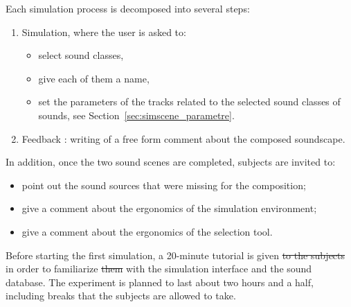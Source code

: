 \documentclass[12pt]{elsarticle}
\providecommand{\DIFadd}[1]{{\protect\color{blue}\uwave{#1}}} %
\providecommand{\DIFdel}[1]{{\protect\color{red}\sout{#1}}}                      %
\providecommand{\DIFaddbegin}{} %
\providecommand{\DIFaddend}{} %
\providecommand{\DIFdelbegin}{} %
\providecommand{\DIFdelend}{} %
\begin{document}
Each simulation process is decomposed into several steps:

 \begin{enumerate} 
\item Simulation, where the user is asked to:
   \begin{itemize} 
  \item  select sound classes,
  \item  give each of them a name,
  \item  set the parameters of the tracks related to the selected sound classes of sounds, see Section~\ref{sec:simscene_parametre}.
   \end{itemize} 
\item Feedback : writing of a free form comment about the composed soundscape.
 \end{enumerate} 

%

In addition, once the two sound scenes are completed, \DIFaddbegin \DIFadd{the }\DIFaddend subjects are invited to:

 \begin{itemize} 
\item  point out the sound sources that were missing for the composition;
\item  give a comment about the ergonomics of the simulation environment;
\item  give a comment about the ergonomics of the selection tool.
 \end{itemize} 


Before starting the first simulation, a 20-minute tutorial is given \DIFdelbegin \DIFdel{to the subjects }\DIFdelend in order to familiarize \DIFdelbegin \DIFdel{them }\DIFdelend \DIFaddbegin \DIFadd{the subjects }\DIFaddend with the simulation interface and the sound database. The experiment is planned to last about two hours and a half, including breaks that the subjects are allowed to take.
\end{document}
